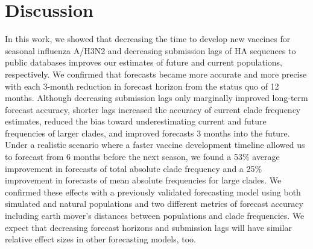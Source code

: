 \documentclass[9pt,lineno]{elife}
\begin{document}
\section{Discussion}

In this work, we showed that decreasing the time to develop new vaccines for seasonal influenza A/H3N2 and decreasing submission lags of HA sequences to public databases improves our estimates of future and current populations, respectively.
We confirmed that forecasts became more accurate and more precise with each 3-month reduction in forecast horizon from the status quo of 12 months.
Although decreasing submission lags only marginally improved long-term forecast accuracy, shorter lags increased the accuracy of current clade frequency estimates, reduced the bias toward underestimating current and future frequencies of larger clades, and improved forecasts 3 months into the future.
Under a realistic scenario where a faster vaccine development timeline allowed us to forecast from 6 months before the next season, we found a 53\% average improvement in forecasts of total absolute clade frequency and a 25\% improvement in forecasts of mean absolute frequencies for large clades.
We confirmed these effects with a previously validated forecasting model using both simulated and natural populations and two different metrics of forecast accuracy including earth mover's distances between populations and clade frequencies.
We expect that decreasing forecast horizons and submission lags will have similar relative effect sizes in other forecasting models, too.
\end{document}
